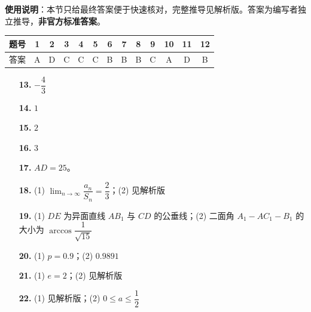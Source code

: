 
\begin{gknotice}
\textbf{使用说明}：本节只给最终答案便于快速核对，完整推导见解析版。答案为编写者独立推导，\textbf{非官方标准答案}。
\end{gknotice}

\begin{center}\begin{tabular}{ccccccccccccc}
\toprule
题号 & 1 & 2 & 3 & 4 & 5 & 6 & 7 & 8 & 9 & 10 & 11 & 12 \\
\midrule
答案 & A & D & C & C & C & B & B & B & C & A & D & B \\
\bottomrule
\end{tabular}\end{center}

\begin{itemize}[leftmargin=2.6em]
  \item[\textbf{13.}] $-\dfrac43$
  \item[\textbf{14.}] $1$
  \item[\textbf{15.}] $2$
  \item[\textbf{16.}] $3$
\end{itemize}

\begin{itemize}[leftmargin=2.6em]
  \item[\textbf{17.}] $AD=25$。
  \item[\textbf{18.}] (1) $\displaystyle\lim_{n\to\infty}\dfrac{a_n}{S_n}=\dfrac23$；(2) 见解析版
  \item[\textbf{19.}] (1) $DE$ 为异面直线 $AB_1$ 与 $CD$ 的公垂线；(2) 二面角 $A_1-AC_1-B_1$ 的大小为 $\arccos\dfrac1{\sqrt{15}}$
  \item[\textbf{20.}] (1) $p=0.9$；(2) $0.9891$
  \item[\textbf{21.}] (1) $e=2$；(2) 见解析版
  \item[\textbf{22.}] (1) 见解析版；(2) $0\leq a\leq\dfrac12$
\end{itemize}
